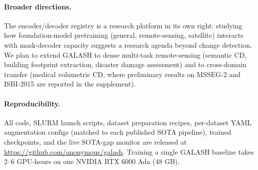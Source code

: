 \paragraph{Broader directions.} The encoder/decoder registry is a research
platform in its own right: studying how foundation-model pretraining
(general, remote-sensing, satellite) interacts with mask-decoder capacity
suggests a research agenda beyond change detection. We plan to extend
GALASH to dense multi-task remote-sensing (semantic CD, building footprint
extraction, disaster damage assessment) and to cross-domain transfer
(medical volumetric CD, where preliminary results on MSSEG-2 and ISBI-2015
are reported in the supplement).

\paragraph{Reproducibility.} All code, SLURM launch scripts, dataset
preparation recipes, per-dataset YAML augmentation configs (matched to
each published SOTA pipeline), trained checkpoints, and the live
SOTA-gap monitor are released at
\url{https://github.com/anonymous/galash}. Training a single GALASH
baseline takes 2--6 GPU-hours on one NVIDIA RTX 6000 Ada (48 GB).
